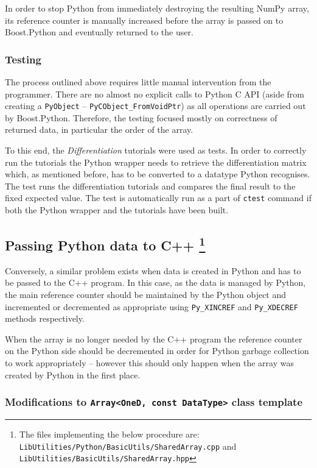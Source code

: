 In order to stop Python from immediately destroying the resulting NumPy array, its reference counter 
is manually increased before the array is passed on to Boost.Python and eventually returned to the user.

\subsubsection{Testing}

The process outlined above requires little manual intervention from the programmer. There are no almost 
no explicit calls to Python C API (aside from creating a \texttt{PyObject} -- \texttt{PyCObject\_FromVoidPtr}) 
as all operations are carried out by Boost.Python. Therefore, the testing focused mostly on correctness 
of returned data, in particular the order of the array.

To this end, the \emph{Differentiation} tutorials were used as tests. In order to correctly run the 
tutorials the Python wrapper needs to retrieve the differentiation matrix which, as mentioned before, 
has to be converted to a datatype Python recognises. The test runs the differentiation tutorials and 
compares the final result to the fixed expected value. The test is automatically run as a part of 
\texttt{ctest} command if both the Python wrapper and the tutorials have been built.

\subsection{Passing Python data to C++ 
\footnote{The files implementing the below procedure are: \texttt{LibUtilities/Python/BasicUtils/SharedArray.cpp} and \texttt{LibUtilities/BasicUtils/SharedArray.hpp}} }

Conversely, a similar problem exists when data is created in Python and has to be passed to 
the C++ program. In this case, as the data is managed by Python, the main reference counter 
should be maintained by the Python object and incremented or decremented as appropriate 
using \texttt{Py\_XINCREF} and \texttt{Py\_XDECREF} methods respectively.

When the array is no longer needed by the C++ program the reference counter on the Python 
side should be decremented in order for Python garbage collection to work appropriately 
-- however this should only happen when the array was created by Python in the first place. 

\subsubsection{Modifications to \texttt{Array<OneD, const DataType>} class template}

